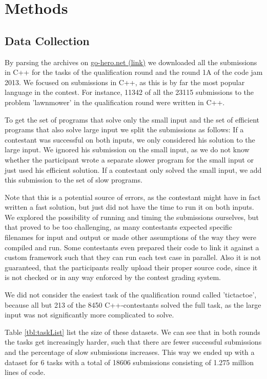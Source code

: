 \section{Methods}
\subsection*{Data Collection}
By parsing the archives on \href{http://www.go-hero.net/jam/13}{go-hero.net (link)} we downloaded all the submissions in C++ for the tasks of the qualification round and the round 1A of the code jam 2013. We focused on submissions in C++, as this is by far the most popular language in the contest. For instance, 11342 of all the 23115 submissions to the problem 'lawnmower' in the qualification round were written in C++.

To get the set of programs that solve only the small input and the set of efficient programs that also solve large input we split the submissions as follows: If a contestant was successful on both inputs, we only considered his solution to the large input. We ignored his submission on the small input, as we do not know whether the participant wrote a separate slower program for the small input or just used his efficient solution. If a contestant only solved the small input, we add this submission to the set of slow programs.

Note that this is a potential source of errors, as the contestant might have in fact written a fast solution, but just did not have the time to run it on both inputs.
We explored the possibility of running and timing the submissions ourselves, but that proved to be too challenging, as many contestants expected specific filenames for input and output or made other assumptions of the way they were compiled and run. Some contestants even prepared their code to link it against a custom framework such that they can run each test case in parallel.
Also it is not guaranteed, that the participants really upload their proper source code, since it is not checked or in any way enforced by the contest grading system.

We did not consider the easiest task of the qualification round called 'tictactoe', because all but 213 of the 8450 C++-contestants solved the full task, as the large input was not significantly more complicated to solve.

Table \ref{tbl:taskList} list the size of these datasets. We can see that in both rounds the tasks get increasingly harder, such that there are fewer successful submissions and the percentage of slow submissions increases.
This way we ended up with a dataset for 6 tasks with a total of 18606 submissions consisting of 1.275 million lines of code.

